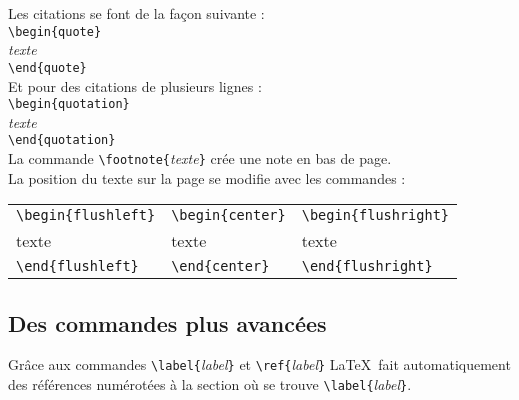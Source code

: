 \documentclass[11pt]{article}				%
\begin{document}
\newpage


\noindent Les citations se font de la façon suivante : \\
\verb?\begin{quote}? \\
\emph{texte} \\
\verb?\end{quote}? \\

\noindent Et pour des citations de plusieurs lignes : \\
\verb?\begin{quotation}? \\
\emph{texte} \\
\verb?\end{quotation}? \\


\noindent La commande \verb?\footnote{?\emph{texte}\verb?}? crée une note en bas de page. \\


\noindent La position du texte sur la page se modifie avec les commandes : \\

\begin{tabular}{lll}

\verb?\begin{flushleft}? & \verb?\begin{center}? & \verb?\begin{flushright}? \\
texte & texte & texte \\
\verb?\end{flushleft}? & \verb?\end{center}? & \verb?\end{flushright}? \\

\end{tabular}



\subsection{Des commandes plus avancées}


\noindent Grâce aux commandes \verb?\label{?\emph{label}\verb?}? et \verb?\ref{?\emph{label}\verb?}? \LaTeX \ fait automatiquement des références numérotées à la section où se trouve \verb?\label{?\emph{label}\verb?}?. \\
\end{document}
